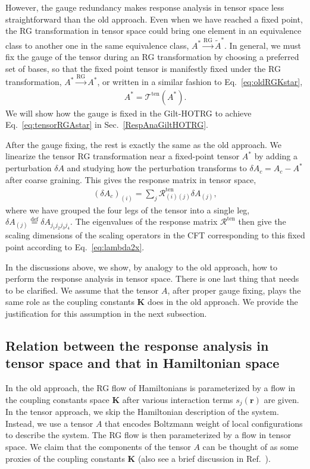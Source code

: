 \documentclass[aps,prb,reprint,superscriptaddress]{revtex4-2}
\newcommand{\defeq}{\stackrel{\text{def}}{=}}
\begin{document}
However, the gauge redundancy makes response analysis in tensor space less
straightforward than the old approach. Even when we have reached a fixed
point, the RG transformation in tensor space could bring one element in
an equivalence class to another one in the same equivalence class, $A^*
\xrightarrow{\text{RG}} \tilde{A}^*$. In general, we must fix the gauge
of the tensor during an RG transformation by choosing a preferred set of
bases, so that the fixed point tensor is manifestly fixed under the RG
transformation, $A^* \xrightarrow{\text{RG}} A^*$, or written in a
similar fashion to Eq.~\eqref{eq:oldRGKstar},
%
\begin{align}\label{eq:tensorRGAstar}
    A^* = \mathcal{T}^{\text{ten}}\left(A^* \right).
\end{align}
%
We will show how the gauge is fixed in the Gilt-HOTRG to achieve
Eq.~\eqref{eq:tensorRGAstar} in Sec.~\ref{RespAnaGiltHOTRG}.
%

After the gauge fixing, the rest is exactly the same as the old
approach. We linearize the tensor RG transformation near a fixed-point
tensor $A^*$ by adding a perturbation $\delta A$ and studying how the
perturbation
transforms to $\delta A_c = A_c - A^*$ after coarse graining. This gives the
response matrix in tensor space,
%
\begin{align}\label{eq:respMatTen}
    \left(\delta A_c\right)_{(i)} = \sum_j
    \mathcal{R}^{\text{ten}}_{(i)(j)} \delta A_{(j)},
\end{align}
%
where we have grouped the four legs of the tensor into a single leg,
$\delta A_{(j)} \defeq \delta A_{j_1 j_2 j_3 j_4}$. The eigenvalues of
the response matrix $\mathcal{R}^{\text{ten}}$ then give the scaling
dimensions of the scaling operators in the CFT corresponding to this
fixed point according to Eq.~\eqref{eq:lambda2x}.
%

In the discussions above, we show, by analogy to the old approach, how
to perform the response analysis in tensor space. There is one last thing
that needs to be clarified. We assume that the tensor $A$, after proper
gauge fixing, plays the same role as the coupling constants
$\mathbf{K}$ does in the old approach. We provide the justification for
this assumption in the next subsection.
%


\subsection{Relation between the response analysis in tensor space and that
in Hamiltonian space\label{relateTensorCoupling}}
In the old approach, the RG flow of Hamiltonians is parameterized by a
flow in the coupling constants space $\mathbf{K}$ after various interaction
terms $s_j(\mathbf{r})$ are given. In the tensor approach, we skip the
Hamiltonian description of the system. Instead, we use a tensor $A$
that encodes Boltzmann weight of local configurations to describe the
system. The RG flow is then parameterized by a flow in tensor space. We
claim that the components of the tensor $A$ can be thought of as some
proxies of the coupling constants $\mathbf{K}$ (also see a brief
discussion in Ref.~\cite{GuWen2009}).
%
\end{document}
